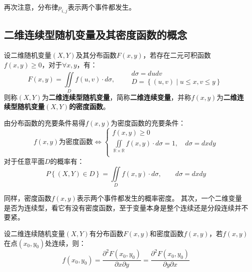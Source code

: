 \begin{tcolorbox}
再次注意，分布律$p_{i,j}$表示两个事件都发生。
\end{tcolorbox}

\subsection{二维连续型随机变量及其密度函数的概念}

\begin{definition}[二维连续型随机变量及其密度函数]
设二维随机变量$\left( X,Y \right) $及其分布函数$F\left( x,y \right) $，若存在二元可积函数$f\left( x,y \right) \geqslant 0$，对于$\forall x,y$，有：
\[
F\left( x,y \right) =\iint\limits_D{f\left( u,v \right) \cdot d\sigma},\qquad \begin{array}{l}
	d\sigma =dudv\\
	D=\left\{ \left( u,v \right) \middle| u\leqslant x,v\leqslant y \right\}\\
\end{array}
\]
则称$\left( X,Y \right) $为{\bf 二维连续型随机变量}，简称{\bf 二维连续变量}，并称$f\left( x,y \right) $为{\bf 二维连续型随机变量$\left( X,Y \right) $的密度函数}。
\end{definition}

由分布函数的充要条件易得$f\left( x,y \right) $为密度函数的充要条件：
\[
f\left( x,y \right) \text{为密度函数}\Leftrightarrow \begin{cases}
	f\left( x,y \right) \geqslant 0\\
	\iint\limits_{\mathbb{R} \times \mathbb{R}}{f\left( x,y \right) \cdot d\sigma}=1,\quad d\sigma =dxdy\\
\end{cases}
\]
对于任意平面$D$的概率有：
\[
P\left\{ \left( X,Y \right) \in D \right\} =\iint\limits_D{f\left( x,y \right) \cdot d\sigma},\qquad d\sigma =dxdy
\]

\begin{tcolorbox}
同样，密度函数$f\left( x,y \right) $表示两个事件都发生的概率密度。
其次，一个二维变量是否为连续型，看它有没有密度函数，至于变量本身是整个连续还是分段连续并不要紧。
\end{tcolorbox}


\begin{theorem}
设二维连续随机变量$\left( X,Y \right) $有分布函数$F\left( x,y \right) $和密度函数$f\left( x,y \right) $，若$f\left( x,y \right) $在点$\left( x_0,y_0 \right) $处连续，则：
\[
f\left( x_0,y_0 \right) =\frac{\partial ^2F\left( x_0,y_0 \right)}{\partial x\partial y}=\frac{\partial ^2F\left( x_0,y_0 \right)}{\partial y\partial x}
\]
\end{theorem}

